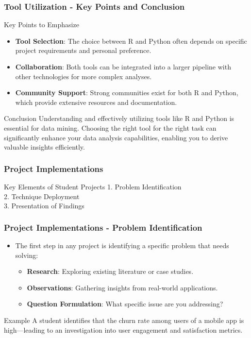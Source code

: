 \documentclass[aspectratio=169]{beamer}
\begin{document}
\begin{frame}
    \frametitle{Tool Utilization - Key Points and Conclusion}
    \begin{block}{Key Points to Emphasize}
        \begin{itemize}
            \item \textbf{Tool Selection}: The choice between R and Python often depends on specific project requirements and personal preference.
            \item \textbf{Collaboration}: Both tools can be integrated into a larger pipeline with other technologies for more complex analyses.
            \item \textbf{Community Support}: Strong communities exist for both R and Python, which provide extensive resources and documentation.
        \end{itemize}
    \end{block}
    
    \begin{block}{Conclusion}
        Understanding and effectively utilizing tools like R and Python is essential for data mining. Choosing the right tool for the right task can significantly enhance your data analysis capabilities, enabling you to derive valuable insights efficiently.
    \end{block}
\end{frame}

\begin{frame}
    \frametitle{Project Implementations}
    \begin{block}{Key Elements of Student Projects}
        1. Problem Identification \\
        2. Technique Deployment \\
        3. Presentation of Findings
    \end{block}
\end{frame}

\begin{frame}
    \frametitle{Project Implementations - Problem Identification}
    \begin{itemize}
        \item The first step in any project is identifying a specific problem that needs solving:
        \begin{itemize}
            \item \textbf{Research}: Exploring existing literature or case studies.
            \item \textbf{Observations}: Gathering insights from real-world applications.
            \item \textbf{Question Formulation}: What specific issue are you addressing?
        \end{itemize}
    \end{itemize}
    \begin{block}{Example}
        A student identifies that the churn rate among users of a mobile app is high—leading to an investigation into user engagement and satisfaction metrics.
    \end{block}
\end{frame}
\end{document}
